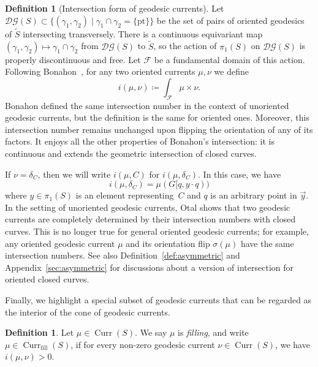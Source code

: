 \documentclass[11pt]{amsart}
\newcommand{\ora}[1]{\overrightarrow{#1}}
\numberwithin{equation}{section}
\numberwithin{figure}{section}
\theoremstyle{definition}
\newtheorem{definition}[theorem]{Definition}
\theoremstyle{plain}
\newcommand\cD{\ensuremath{\mathcal{D}}}
\newcommand\cG{\ensuremath{\mathcal{G}}}
\DeclareMathOperator{\Curr}{Curr}
\newcommand*{\wt}[1]{\widetilde{#1}}
\begin{document}
\begin{definition}[Intersection form of geodesic currents]
Let $\mathcal{D}\mathcal{G}(S) \subset \{ (\gamma_1,\gamma_2) \mid \gamma_1 \cap \gamma_2 = \{ \mbox{pt} \} \}$ be the set of pairs of oriented geodesics of $\wt{S}$ intersecting transversely.
There is a continuous equivariant map $(\gamma_1,\gamma_2) \mapsto
\gamma_1 \cap \gamma_2$ from $\mathcal{D}\mathcal{G}(S)$ to $\wt{S}$,
so the action of $\pi_1(S)$ on $\cD\cG(S)$ is properly discontinuous and free. Let
$\mathcal{F}$ be a fundamental domain of this action. Following
Bonahon~\cite{Bonahon86:EndsHyperbolicManifolds}, for any two oriented
currents $\mu, \nu$ we define
\begin{equation}
i(\mu, \nu) \coloneqq \int_{\mathcal{F}} \mu \times \nu.
\label{eq:intersection}
\end{equation}
Bonahon defined the same intersection number in the context of unoriented geodesic currents, but the definition is the same for oriented ones. Moreover, this intersection number remains unchanged upon flipping the orientation of any of its factors.
It enjoys all the other properties of Bonahon's intersection: it is continuous and extends the geometric intersection of closed curves.
\label{def:intersection_currents}
\end{definition}

If $\nu=\delta_C$, then we will write $i(\mu, C)$ for $i(\mu, \delta_C)$.
In this case, we have
\begin{equation}
i(\mu, \delta_C)=\mu(G[q,y \cdot q))
\label{eq:intersection_curve}
\end{equation}
where $y \in \pi_1(S)$ is an element representing~$C$ and $q$ is an
arbitrary point in
$\ora{y}$.
In the setting of unoriented geodesic currents, Otal
\cite[Th\'eor\`eme~2]{Otal90:SpectreMarqueNegative} shows that two
geodesic currents are completely determined by their intersection
numbers with closed curves.
This is no longer true for general oriented geodesic currents; for example,
any oriented geodesic current $\mu$ and its orientation flip $\sigma(\mu)$ have the same intersection numbers. 
See also Definition~\ref{def:asymmetric} and Appendix~\ref{sec:asymmetric} for discussions about a version of intersection for oriented closed curves.

Finally, we highlight a special subset of geodesic currents that can be regarded as the interior of the cone of geodesic currents.

\begin{definition}
  Let $\mu \in \Curr(S)$. We say $\mu$ is \emph{filling}, and write
  $\mu \in \Curr_{\mathrm{fill}}(S)$, if for every non-zero geodesic
  current $\nu \in \Curr(S)$, we have $i(\mu, \nu)>0$.
\label{def:filling_current}
\end{definition}
\end{document}
